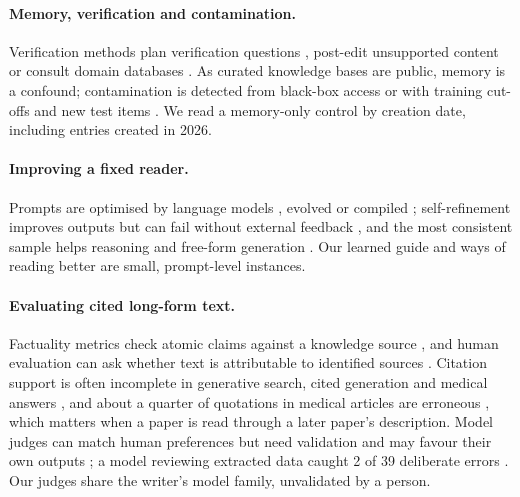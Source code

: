 \documentclass{article} %
\begin{document}
\paragraph{Memory, verification and contamination.}
Verification methods plan verification questions \citep{dhuliawala2024chainofverification}, post-edit unsupported content \citep{Gao2022RarrResearching} or consult domain databases \citep{wang2025geneagent}. As curated knowledge bases are public, memory is a confound; contamination is detected from black-box access \citep{Shi2023DetectingPretraining,oren2024proving,golchin2024time,Golchin2025DataContamination} or with training cut-offs and new test items \citep{Roberts2023DataContamination,Jain2024LivecodebenchHolistic,White2024LivebenchChallenging}. We read a memory-only control by creation date, including entries created in 2026.

\paragraph{Improving a fixed reader.}
Prompts are optimised by language models \citep{Zhou2022LargeLanguage,Pryzant2023AutomaticPrompt,Yang2023LargeLanguage}, evolved \citep{Guo2023EvopromptConnecting,Fernando2023PromptbreederSelfreferential,agrawal2026gepa} or compiled \citep{Khattab2023DspyCompiling,Opsahlong2024OptimizingInstructions}; self-refinement improves outputs \citep{Madaan2023SelfrefineIterative} but can fail without external feedback \citep{Huang2023LargeLanguage}, and the most consistent sample helps reasoning and free-form generation \citep{Wang2022SelfconsistencyImproves,Chen2023UniversalSelfconsistency}. Our learned guide and ways of reading better are small, prompt-level instances.

\paragraph{Evaluating cited long-form text.}
Factuality metrics check atomic claims against a knowledge source \citep{min2023factscore,wei2024longform,Song2024VeriscoreEvaluating}, and human evaluation can ask whether text is attributable to identified sources \citep{Rashkin2021MeasuringAttribution}. Citation support is often incomplete in generative search, cited generation and medical answers \citep{Liu2023EvaluatingVerifiability,gao2023enabling,wu2025automated}, and about a quarter of quotations in medical articles are erroneous \citep{jergas2015quotation}, which matters when a paper is read through a later paper's description. Model judges can match human preferences \citep{zheng2023judging} but need validation \citep{shankar2024who} and may favour their own outputs \citep{panickssery2024llm}; a model reviewing extracted data caught 2 of 39 deliberate errors \citep{Stewartevans2025ExpeditingData}. Our judges share the writer's model family, unvalidated by a person.
\end{document}
